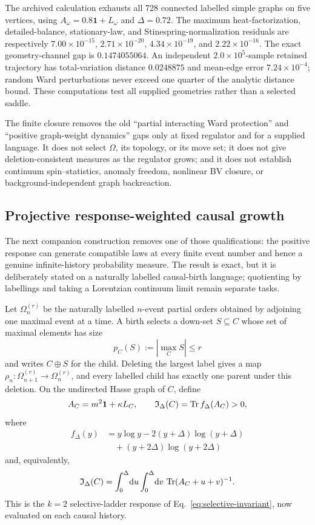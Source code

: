 The archived calculation exhausts all 728 connected labelled simple graphs
on five vertices, using
\(A_\omega=0.8\mathbf1+L_\omega\) and \(\Delta=0.72\).
The maximum heat-factorization, detailed-balance, stationary-law, and
Stinespring-normalization residuals are respectively
\(7.00\times10^{-15}\), \(2.71\times10^{-20}\),
\(4.34\times10^{-19}\), and \(2.22\times10^{-16}\).
The exact geometry-channel gap is \(0.1474055064\).  An independent
\(2.0\times10^5\)-sample retained trajectory has total-variation distance
\(0.0248875\) and mean-edge error \(7.24\times10^{-4}\); random Ward
perturbations never exceed one quarter of the analytic distance bound.
These computations test all supplied geometries rather than a selected
saddle.

The finite closure removes the old ``partial interacting Ward protection''
and ``positive graph-weight dynamics'' gaps only at fixed regulator and for
a supplied language.  It does not select \(\Omega\), its topology, or its
move set; it does not give deletion-consistent measures as the regulator
grows; and it does not establish continuum spin--statistics, anomaly
freedom, nonlinear BV closure, or background-independent graph
backreaction.

\subsection{Projective response-weighted causal growth}
\label{sec:projective-response-growth}

The next companion construction
\cite{XuProjectiveCausalGrowth2026} removes one of those qualifications:
the positive response can generate compatible laws at every finite event
number and hence a genuine infinite-history probability measure.  The result
is exact, but it is deliberately stated on a naturally labelled causal-birth
language; quotienting by labellings and taking a Lorentzian continuum limit
remain separate tasks.

Let \(\Omega_n^{(r)}\) be the naturally labelled \(n\)-event partial orders
obtained by adjoining one maximal event at a time.  A birth selects a
down-set \(S\subseteq C\) whose set of maximal elements has size
\[
 p_C(S):=|\max_C S|\leq r
\]
and writes \(C\oplus S\) for the child.  Deleting the largest label gives a
map \(\rho_n:\Omega_{n+1}^{(r)}\to\Omega_n^{(r)}\), and every labelled child
has exactly one parent under this deletion.  On the undirected Hasse graph
of \(C\), define
\begin{equation}
 A_C=m^2\mathbf1+\kappa L_C,\qquad
 \mathfrak I_\Delta(C)=\operatorname{Tr} f_\Delta(A_C)>0 ,
 \label{eq:pcg-response}
\end{equation}
where
\begin{align}
 f_\Delta(y)
 &=y\log y-2(y+\Delta)\log(y+\Delta)\nonumber\\
 &\quad +(y+2\Delta)\log(y+2\Delta)
 \label{eq:pcg-f}
\end{align}
and, equivalently,
\begin{equation}
 \mathfrak I_\Delta(C)=
 \int_0^\Delta\!\mathrm d u\int_0^\Delta\!\mathrm d v\,
 \operatorname{Tr}(A_C+u+v)^{-1}.
 \label{eq:pcg-positive}
\end{equation}
This is the \(k=2\) selective-ladder response of
Eq.~\eqref{eq:selective-invariant}, now evaluated on each causal history.

